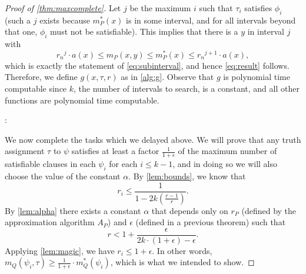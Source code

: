 \documentclass[]{article}
\begin{document}
\begin{proof}[Proof of \autoref{thm:maxcomplete}]
  Let $j$ be the maximum $i$ such that $\tau_i$ satisfies $\phi_i$ (such a $j$ exists because $m^*_P(x)$ is in some interval, and for all intervals beyond that one, $\phi_i$ must not be satisfiable).
  This implies that there is a $y$ in interval $j$ with
  \begin{equation*}
    {r_n}^j \cdot a(x) \leq m_P(x, y) \leq m^*_P(x) \leq {r_n}^{j + 1} \cdot a(x),
  \end{equation*}
  which is exactly the statement of \autoref{eq:subinterval}, and hence \autoref{eq:result} follows.
  Therefore, we define $g(x, \tau, r)$ as in \autoref{alg:g}.
  Observe that $g$ is polynomial time computable since $k$, the number of intervals to search, is a constant, and all other functions are polynomial time computable.
  \begin{algorithm}
    \caption{Deterministic polynomial time algorithm that computes a $r_n$-approximate solution for $x$%
      \label{alg:g}}
    \begin{algorithmic}
      \Statex{}
      :
        \EndFor
         \\
        \hspace{1.5em}
      \EndFunction
    \end{algorithmic}
  \end{algorithm}

  We now complete the tasks which we delayed above.
  We will prove that any truth assignment $\tau$ to $\psi$ satisfies at least a factor $\frac{1}{1 + \epsilon}$ of the maximum number of satisfiable clauses in each $\psi_i$ for each $i \leq k - 1$, and in doing so we will also choose the value of the constant $\alpha$.
  By \autoref{lem:bounds}, we know that
  \begin{equation*}
    r_i \leq \frac{1}{1 - 2k\left(\frac{r - 1}{r}\right)}.
  \end{equation*}
  By \autoref{lem:alpha} there exists a constant $\alpha$ that depends only on $r_P$ (defined by the approximation algorithm $A_P$) and $\epsilon$ (defined in a previous theorem) such that
  \begin{equation}\label{eq:rupper}
    r < 1 + \frac{\epsilon}{2k \cdot (1 + \epsilon) - \epsilon}.
  \end{equation}
  Applying \autoref{lem:magic}, we have $r_i \leq 1 + \epsilon$.
  In other words, $m_Q(\psi_i, \tau) \geq \frac{1}{1 + \epsilon} \cdot m^*_Q(\psi_i)$, which is what we intended to show.


\end{proof}
\end{document}
